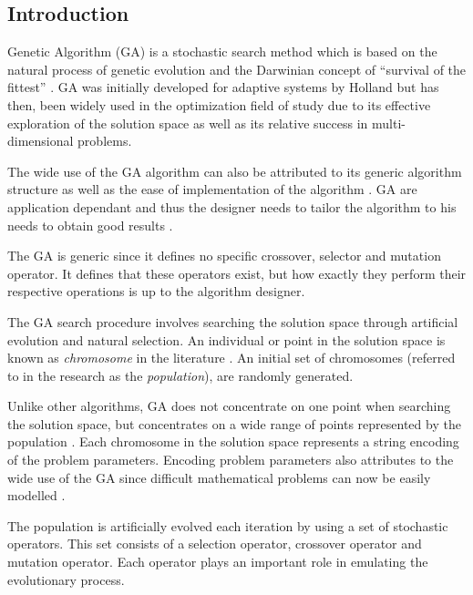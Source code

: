 \subsection{Introduction}
Genetic Algorithm (GA) is a stochastic search method which is based on the natural process of genetic evolution and the Darwinian concept of ``survival of the fittest'' \cite{DistributedHierarchicalGA,AcceleratingGA,AdaptiveSAGA,FamilyGA}. GA was initially developed for adaptive systems by Holland but has then, been widely used in the optimization field of study due to its effective exploration of the solution space as well as its relative success in multi-dimensional problems\cite{ParallelGASA,DistributedHierarchicalGA,FamilyGA}. 

The wide use of the GA algorithm can also be attributed to its generic algorithm structure as well as the ease of implementation of the algorithm \cite{FamilyGA,AdaptiveSAGA}. GA are application dependant and thus the designer needs to tailor the algorithm to his needs to obtain good results \cite{AcceleratingGA}.

The GA is generic since it defines no specific crossover, selector and mutation operator. It defines that these operators exist, but how exactly they perform their respective operations is up to the algorithm designer.

The GA search procedure involves searching the solution space through artificial evolution and natural selection\cite{FamilyGA,MultiPopGA,HybridIntelliGA}. An individual or point in the solution space is known as \emph{chromosome} in the literature \cite{HumanPassiveGA}. An initial set of chromosomes (referred to in the research as the \emph{population}), are randomly generated\cite{FamilyGA,HybridIntelliGA,AcceleratingGA,MultiPopGA}. 

Unlike other algorithms, GA does not concentrate on one point when searching the solution space, but concentrates on a wide range of points represented by the population \cite{DistributedHierarchicalGA,FamilyGA,HybridIntelliGA}\label{GASearchPoints}. Each chromosome in the solution space represents a string encoding of the problem parameters\cite{FamilyGA}. Encoding problem parameters also attributes to the wide use of the GA since difficult mathematical problems can now be easily modelled \cite{AcceleratingGA}.

The population is artificially evolved each iteration by using a set of stochastic operators\cite{SelfAdaptiveGA}. This set consists of a selection operator, crossover operator and mutation operator\cite{SelfAdaptiveGA,MultiPopGA}. Each operator plays an important role in emulating the evolutionary process. 

